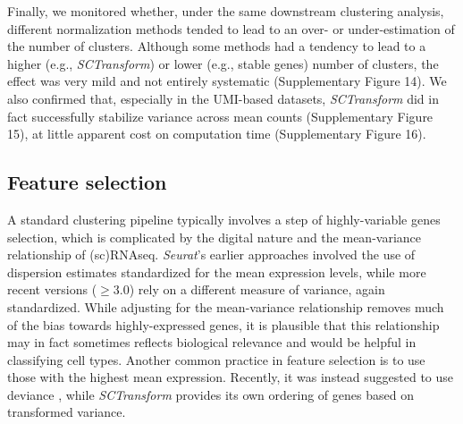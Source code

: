 \documentclass{bmcart}
\begin{document}
Finally, we monitored whether, under the same downstream clustering analysis, different normalization methods tended to lead to an over- or under-estimation of the number of clusters. Although some methods had a tendency to lead to a higher (e.g., \textit{SCTransform}) or lower (e.g., stable genes) number of clusters, the effect was very mild and not entirely systematic (Supplementary Figure 14). We also confirmed that, especially in the UMI-based datasets, \textit{SCTransform} did in fact successfully stabilize variance across mean counts (Supplementary Figure 15), at little apparent cost on computation time (Supplementary Figure 16).

\subsection*{Feature selection}

A standard clustering pipeline typically involves a step of highly-variable genes selection, which is complicated by the digital nature and the mean-variance relationship of (sc)RNAseq. \textit{Seurat}'s earlier approaches involved the use of dispersion estimates standardized for the mean expression levels, while more recent versions ($\geq$3.0) rely on a different measure of variance, again standardized. While adjusting for the mean-variance relationship removes much of the bias towards highly-expressed genes, it is plausible that this relationship may in fact sometimes reflects biological relevance and would be helpful in classifying cell types. Another common practice in feature selection is to use those with the highest mean expression. Recently, it was instead suggested to use deviance \cite{townesGlmpca2019}, while \textit{SCTransform} provides its own ordering of genes based on transformed variance.
\end{document}
